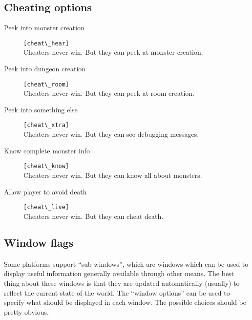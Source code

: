 \subsection{Cheating options}
\begin{description}
\item[Peek into monster creation] \verb+[cheat\_hear]+\\
    Cheaters never win. But they can peek at monster creation.

\item[Peek into dungeon creation] \verb+[cheat\_room]+\\
    Cheaters never win. But they can peek at room creation.

\item[Peek into something else] \verb+[cheat\_xtra]+\\
    Cheaters never win. But they can see debugging messages.

\item[Know complete monster info] \verb+[cheat\_know]+\\
    Cheaters never win. But they can know all about monsters.

\item[Allow player to avoid death] \verb+[cheat\_live]+\\
    Cheaters never win. But they can cheat death.
\end{description}

\subsection{Window flags}
\paragraph{}Some platforms support ``sub-windows'', which are windows
which can be used to display useful information generally available
through other means. The best thing about these windows is that they are
updated automatically (usually) to reflect the current state of the
world. The ``window options'' can be used to specify what should be
displayed in each window. The possible choices should be pretty
obvious.

